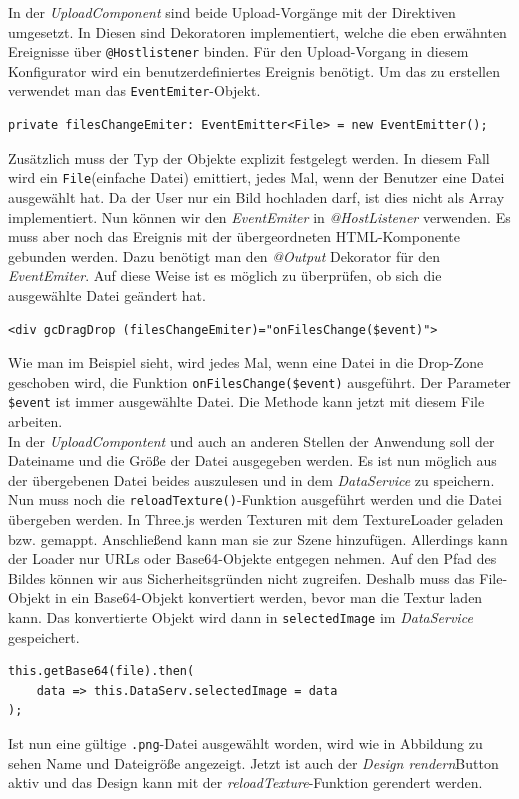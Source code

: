 In der \textit{UploadComponent} sind beide Upload-Vorgänge mit der Direktiven umgesetzt. In Diesen sind Dekoratoren implementiert, welche die eben erwähnten  Ereignisse über \texttt{@Hostlistener} binden. Für den Upload-Vorgang in diesem Konfigurator wird ein benutzerdefiniertes Ereignis benötigt. Um das zu erstellen verwendet man das \texttt{EventEmiter}-Objekt.
%
\begin{lstlisting}[caption={Umsetzung des Event-Emiter-Objekts},label=lst:eventemiter]
private filesChangeEmiter: EventEmitter<File> = new EventEmitter();
\end{lstlisting}
%
Zusätzlich muss der Typ der Objekte explizit festgelegt werden. In diesem Fall wird ein \texttt{File}(einfache Datei) emittiert, jedes Mal, wenn der Benutzer eine Datei ausgewählt hat. Da der User nur ein Bild hochladen darf, ist dies nicht als Array implementiert. Nun können wir den \textit{EventEmiter} in \textit{@HostListener} verwenden. Es muss aber noch das Ereignis mit der übergeordneten HTML-Komponente gebunden werden. Dazu benötigt man den \textit{@Output} Dekorator für den \textit{EventEmiter}. Auf diese Weise ist es möglich zu überprüfen, ob sich die ausgewählte Datei geändert hat.
%
\begin{lstlisting}[caption={Drop-Zone Element mit der EventEmiter-Funktion},label=lst:dropzone]
<div gcDragDrop (filesChangeEmiter)="onFilesChange($event)">
\end{lstlisting}
%
Wie man im Beispiel sieht, wird jedes Mal, wenn eine Datei in die Drop-Zone geschoben wird, die Funktion \texttt{onFilesChange(\$event)} ausgeführt. Der Parameter \texttt{\$event} ist immer ausgewählte Datei. Die Methode kann jetzt mit diesem File arbeiten.\\

In der \textit{UploadCompontent} und auch an anderen Stellen der Anwendung soll der Dateiname und die Größe der Datei ausgegeben werden. Es ist nun möglich aus der übergebenen Datei beides auszulesen und in dem \textit{DataService} zu speichern. Nun muss noch die \texttt{reloadTexture()}-Funktion ausgeführt werden und die Datei übergeben werden. In Three.js werden Texturen mit dem TextureLoader geladen bzw. gemappt. Anschließend kann man sie zur Szene hinzufügen. Allerdings kann der Loader nur URLs oder Base64-Objekte entgegen nehmen. Auf den Pfad des Bildes können wir aus Sicherheitsgründen nicht zugreifen. Deshalb muss das File-Objekt in ein Base64-Objekt konvertiert werden, bevor man die Textur laden kann. Das konvertierte Objekt wird dann in \texttt{selectedImage} im \textit{DataService} gespeichert.
%
\begin{lstlisting}[caption={Base64 Methode},label=lst:base64]
this.getBase64(file).then(
	data => this.DataServ.selectedImage = data
);
\end{lstlisting}
%
Ist nun eine gültige \texttt{.png}-Datei ausgewählt worden, wird wie in Abbildung zu sehen Name und Dateigröße angezeigt. Jetzt ist auch der \textit{Design rendern}Button aktiv und das Design kann mit der \textit{reloadTexture}-Funktion gerendert werden.

